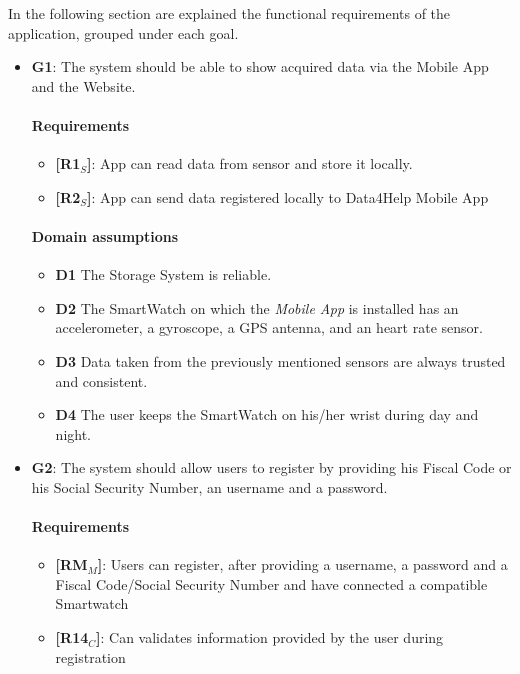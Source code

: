 In the following section are explained the functional requirements of the application, grouped under each goal.

\begin{itemize}
    \item \textbf{G1}: The system should be able to show acquired data via the Mobile App and the Website.
    \paragraph{Requirements}
   \begin{itemize}
    \item \textbf{[R1$_S$]}: App can read data from sensor and store it locally.
    \item \textbf{[R2$_S$]}: App can send data registered locally to Data4Help Mobile App
   \end{itemize}
   \paragraph{Domain assumptions}
   \begin{itemize}
    \item  \textbf{D1}  The Storage System is reliable.
    
    \item  \textbf{D2}  The SmartWatch on which the \textit{Mobile App} is installed has an accelerometer, a gyroscope, a GPS antenna, and an heart rate sensor.
    
    \item  \textbf{D3}  Data taken from the previously mentioned sensors are always trusted and consistent.
            
    \item  \textbf{D4}  The user keeps the SmartWatch on his/her wrist during day and night.
   \end{itemize}
   
    \item \textbf{G2}: The system should allow users to register by providing his Fiscal Code or his Social Security Number, an username and a password.
    \paragraph{Requirements}
   \begin{itemize}
    \item \textbf{[RM$_M$]}: Users can register, after providing a username, a password and a Fiscal Code/Social Security Number and have connected a compatible Smartwatch
    \item \textbf{[R14$_C$]}: Can validates information provided by the user during registration
   \end{itemize}

\end{itemize}
